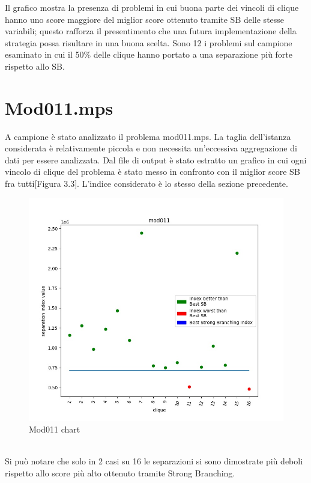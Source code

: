 \documentclass[12pt,a4paper,twoside,openright]{book}
\begin{document}
Il grafico mostra la presenza di problemi in cui buona parte dei vincoli di clique hanno uno score maggiore del miglior
score ottenuto tramite SB delle stesse variabili; questo rafforza il presentimento che una futura implementazione
della strategia possa risultare in una buona scelta. Sono 12 i problemi sul campione esaminato in cui il 50\% delle clique
hanno portato a una separazione più forte rispetto allo SB.

\section{Mod011.mps}
A campione è stato analizzato il problema mod011.mps. La taglia dell'istanza considerata è relativamente piccola
e non necessita un'eccessiva aggregazione di dati per essere analizzata. Dal file di output è stato estratto un grafico
in cui ogni vincolo di clique del problema è stato messo in confronto con il miglior score SB fra tutti[Figura 3.3]. L'indice considerato è lo stesso 
della sezione precedente.\\
\begin{figure}[ht]
    \centering
    \includegraphics [scale = 0.65]{chart_exp1_mod011}
    \caption{Mod011 chart}
    \label{fig:mod011}
\end{figure}\\
Si può notare che solo in 2 casi su 16 le separazioni si sono dimostrate più deboli rispetto allo score
più alto ottenuto tramite Strong Branching. 
\\
\end{document}
